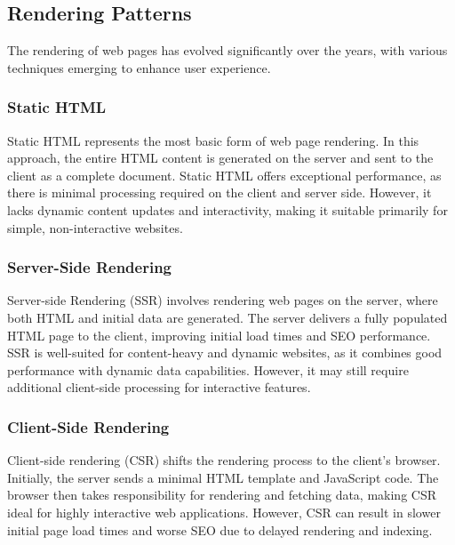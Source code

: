 \subsection{Rendering Patterns}
\label{sec:rendering-patterns}


The rendering of web pages has evolved significantly over the years, with various techniques emerging to enhance user experience. 

\subsubsection{Static HTML}
Static HTML represents the most basic form of web page rendering. In this approach, the entire HTML content is generated on the server and sent to the client as a complete document. Static HTML offers exceptional performance, as there is minimal processing required on the client and server side. However, it lacks dynamic content updates and interactivity, making it suitable primarily for simple, non-interactive websites.

\subsubsection{Server-Side Rendering}
Server-side Rendering (SSR) involves rendering web pages on the server, where both HTML and initial data are generated. The server delivers a fully populated HTML page to the client, improving initial load times and SEO performance. SSR is well-suited for content-heavy and dynamic websites, as it combines good performance with dynamic data capabilities. However, it may still require additional client-side processing for interactive features.

\subsubsection{Client-Side Rendering}
Client-side rendering (CSR) shifts the rendering process to the client's browser. Initially, the server sends a minimal HTML template and JavaScript code. The browser then takes responsibility for rendering and fetching data, making CSR ideal for highly interactive web applications. However, CSR can result in slower initial page load times and worse SEO due to delayed rendering and indexing.

